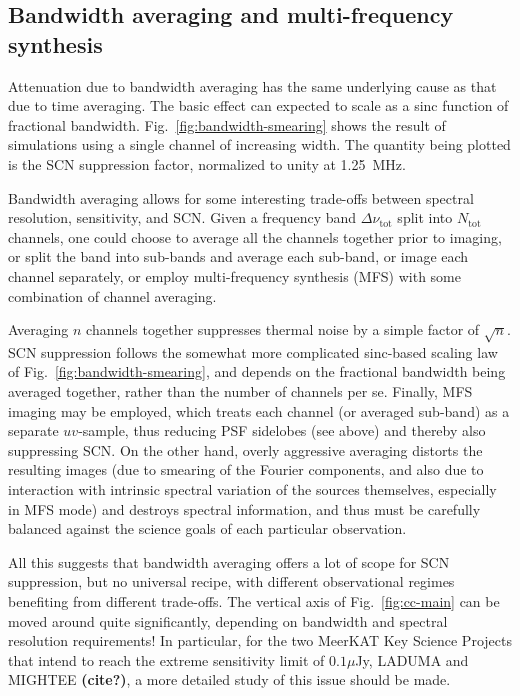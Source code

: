 \documentclass{aa}
\begin{document}
\subsection{Bandwidth averaging and multi-frequency synthesis}
\label{sec:freq-avg}

Attenuation due to bandwidth averaging has the same underlying cause as that due to time averaging. The basic effect can expected to scale as a sinc function of fractional bandwidth. Fig.~\ref{fig:bandwidth-smearing} shows the result of simulations using a single channel of increasing width. The quantity being plotted is the SCN suppression factor, normalized to unity at 1.25~MHz.

Bandwidth averaging allows for some interesting trade-offs between spectral resolution, sensitivity, and SCN. Given a frequency band $\Delta\nu_\mathrm{tot}$ split into $N_\mathrm{tot}$ channels, one could choose to average all the channels together prior to imaging, or split the band into sub-bands and average each sub-band, or image each channel separately, or employ multi-frequency synthesis (MFS) with some combination of channel averaging. 

Averaging $n$ channels together suppresses thermal noise by a simple factor of $\sqrt{n}$. SCN suppression follows the somewhat more complicated sinc-based scaling law of Fig.~\ref{fig:bandwidth-smearing}, and depends on the fractional bandwidth being averaged together, rather than the number of channels per se. Finally, MFS imaging may be employed, which treats each channel (or averaged sub-band) as a separate $uv$-sample, thus reducing PSF sidelobes (see above) and thereby also suppressing SCN. On the other hand, overly aggressive averaging distorts the resulting images (due to smearing of the Fourier components, and also due to interaction with intrinsic spectral variation of the sources themselves, especially in MFS mode) and destroys spectral information, and thus must be carefully balanced against the science goals of each particular observation.

All this suggests that bandwidth averaging offers a lot of scope for SCN suppression, but no universal recipe, with different observational regimes benefiting from different trade-offs. The vertical axis of Fig.~\ref{fig:cc-main} can be moved around quite significantly, depending on bandwidth and spectral resolution requirements! In particular, for the two MeerKAT Key Science Projects that intend to reach the extreme sensitivity limit of $0.1\mu$Jy, LADUMA and MIGHTEE {\bf (cite?)}, a more detailed study of this issue should be made.
\end{document}
